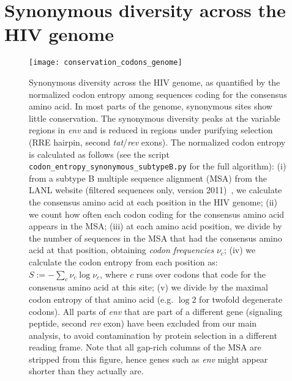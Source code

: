 \section{Synonymous diversity across the HIV genome}
\begin{figure}[h]
\begin{center}
\texttt{[image: conservation\_codons\_genome]}
\caption{
Synonymous diversity across the HIV genome, as quantified by the normalized
codon entropy among sequences coding for the consensus amino acid. In most
parts of the genome, synonymous sites show little conservation. The synonymous
diversity peaks at the variable regions in {\it env} and is reduced in regions 
under purifying selection (RRE hairpin, second {\it tat}/{\it rev} exons). The
normalized codon entropy is calculated as follows (see the script
\texttt{codon\_entropy\_synonymous\_subtypeB.py} for the full algorithm): (i)
from a subtype B multiple sequence alignment (MSA) from the LANL website (filtered sequences only, version 2011)~\cite{LANL2012}, we calculate the
consensus amino acid at each position in the HIV genome; (ii) we count how often
each codon coding for the consensus amino acid appears in the MSA; (iii) at each
amino acid position, we divide by the number of sequences in the MSA that had
the consensus amino acid at that position, obtaining {\it codon frequencies}
$\nu_c$; (iv) we calculate the codon entropy from each position as: $S := -
\sum_{c} \nu_c \log \nu_c$, where $c$ runs over codons that code for the
consensus amino acid at this site; (v) we divide by the maximal codon entropy of
that amino acid (e.g. $\log 2$ for twofold degenerate codons). All parts of
{\it env} that are part of a different gene (signaling peptide, second {\it rev}
exon) have been excluded from our main analysis, to avoid contamination by
protein selection in a different reading frame.
Note that all gap-rich columns of the MSA are stripped from this figure, hence genes such as {\it env} might appear shorter than they actually
are.
}
\label{fig:syndiv_genome}
\end{center}
\end{figure}
\newpage
% 
